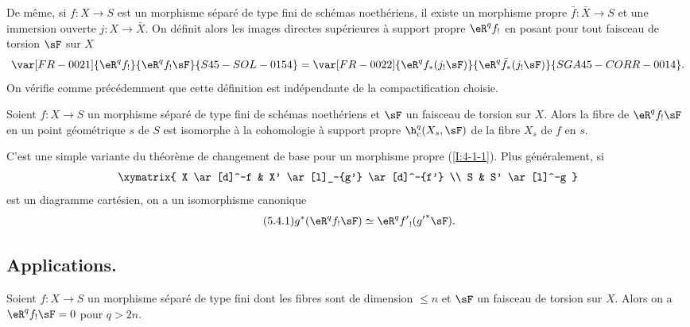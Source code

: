 \subsubsection{}\label{I:4-5-3}

De même, si $f:X\to S$ est un morphisme séparé de type fini de schémas 
noethériens, il existe un morphisme propre $\bar f:\bar X\to S$ et une 
immersion ouverte $j:X\to \bar X$. On définit alors les images directes
supérieures à support propre $\eR^q f_!$ en posant pour tout faisceau de 
torsion $\sF$ sur $X$
\[
  \var[FR-0021]{\eR^q f_!}{\eR^q f_! \sF}{S45-SOL-0154} = \var[FR-0022]{\eR^q f_*(j_! \sF)}{\eR^q \bar f_*(j_! \sF)}{SGA45-CORR-0014} \text{.}
\]
On vérifie comme précédemment que cette définition est indépendante de 
la compactification choisie. 





\begin{theoremdotdash}\label{I:4-5-4}
Soient $f:X\to S$ un morphisme séparé de type fini de schémas noethériens 
et $\sF$ un faisceau de torsion sur $X$. Alors la fibre de $\eR^q f_! \sF$ en un 
point géométrique $s$ de $S$ est isomorphe à la cohomologie à support 
propre $\h_c^q(X_s,\sF)$ de la fibre $X_s$ de $f$ en $s$. 
\end{theoremdotdash}

C'est une simple variante du théorème de changement de base pour un morphisme 
propre (\ref{I:4-1-1}). Plus généralement, si 
\[\xymatrix{
  X \ar[d]^-f
    & X' \ar[l]_-{g'} \ar[d]^-{f'} \\
  S 
    & S' \ar[l]^-g
}\]
est un diagramme cartésien, on a un isomorphisme canonique 
\begingroup
\makeatletter
\tagsleft@true
\let\veqno\@@leqno
\makeatother
\begin{equation*}\tag{5.4.1}\label{I:eq:4-5-4-1}
g^* (\eR^q f_! \sF) \simeq \eR^q {f'}_!({g'}^* \sF) \text{.}
\end{equation*}
\endgroup










\subsection{Applications.}\label{I:4-6}





\begin{sourcenamedfirstdotdash}\label{I:4-6-1}
Soient $f:X\to S$ un morphisme séparé de type fini dont les fibres sont de 
dimension $\leqslant n$ et $\sF$ un faisceau de torsion sur $X$. Alors on a 
$\eR^q f_! \sF = 0$ pour $q>2 n$. 
\end{sourcenamedfirstdotdash}

